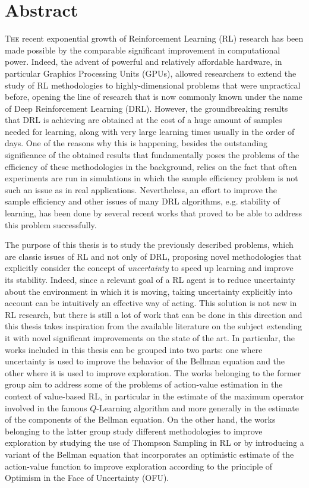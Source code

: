 \chapter*{Abstract}
\lettrine{T}{he} recent exponential growth of Reinforcement Learning (RL) research has been made possible by the comparable significant improvement in computational power. Indeed, the advent of powerful and relatively affordable hardware, in particular Graphics Processing Units (GPUs), allowed researchers to extend the study of RL methodologies to highly-dimensional problems that were unpractical before, opening the line of research that is now commonly known under the name of Deep Reinforcement Learning (DRL). However, the groundbreaking results that DRL is achieving are obtained at the cost of a huge amount of samples needed for learning, along with very large learning times usually in the order of days. One of the reasons why this is happening, besides the outstanding significance of the obtained results that fundamentally poses the problems of the efficiency of these methodologies in the background, relies on the fact that often experiments are run in simulations in which the sample efficiency problem is not such an issue as in real applications. Nevertheless, an effort to improve the sample efficiency and other issues of many DRL algorithms, e.g. stability of learning, has been done by several recent works that proved to be able to address this problem successfully.

The purpose of this thesis is to study the previously described problems, which are classic issues of RL and not only of DRL, proposing novel methodologies that explicitly consider the concept of \textit{uncertainty} to speed up learning and improve its stability. Indeed, since a relevant goal of a RL agent is to reduce uncertainty about the environment in which it is moving, taking uncertainty explicitly into account can be intuitively an effective way of acting. This solution is not new in RL research, but there is still a lot of work that can be done in this direction and this thesis takes inspiration from the available literature on the subject extending it with novel significant improvements on the state of the art. In particular, the works included in this thesis can be grouped into two parts: one where uncertainty is used to improve the behavior of the Bellman equation and the other where it is used to improve exploration. The works belonging to the former group aim to address some of the problems of action-value estimation in the context of value-based RL, in particular in the estimate of the maximum operator involved in the famous $Q$-Learning algorithm and more generally in the estimate of the components of the Bellman equation. On the other hand, the works belonging to the latter group study different methodologies to improve exploration by studying the use of Thompson Sampling in RL or by introducing a variant of the Bellman equation that incorporates an optimistic estimate of the action-value function to improve exploration according to the principle of Optimism in the Face of Uncertainty (OFU).

